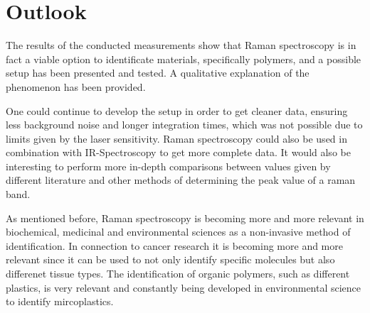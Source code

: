 \section{Outlook}
The results of the conducted measurements show that Raman spectroscopy is in fact a viable option to identificate materials, specifically polymers, and a possible setup has been presented and tested. A qualitative explanation of the phenomenon has been provided.

\bigskip

One could continue to develop the setup in order to get cleaner data, ensuring less background noise and longer integration times, which was not possible due to limits given by the laser sensitivity. Raman spectroscopy could also be used in combination with IR-Spectroscopy to get more complete data. It would also be interesting to perform more in-depth comparisons between values given by different literature and other methods of determining the peak value of a raman band.

\bigskip

As mentioned before, Raman spectroscopy is becoming more and more relevant in biochemical, medicinal and environmental sciences as a non-invasive method of identification. In connection to cancer research it is becoming more and more relevant since it can be used to not only identify specific molecules but also differenet tissue types. The identification of organic polymers, such as different plastics, is very relevant and constantly being developed in environmental science to identify mircoplastics.
